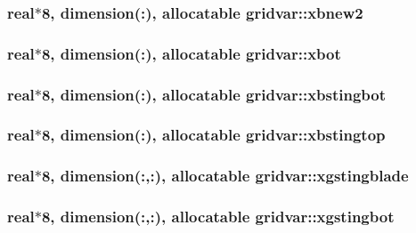 \subsubsection[{xbnew2}]{\setlength{\rightskip}{0pt plus 5cm}real$\ast$8, dimension(\+:), allocatable gridvar\+::xbnew2}\label{namespacegridvar_af05e411d94cae29c5a5ac414c9d43621}
\hypertarget{namespacegridvar_abda87534e29c12083ccea2d949c300e9}{}
\subsubsection[{xbot}]{\setlength{\rightskip}{0pt plus 5cm}real$\ast$8, dimension(\+:), allocatable gridvar\+::xbot}\label{namespacegridvar_abda87534e29c12083ccea2d949c300e9}
\hypertarget{namespacegridvar_a7b37df25204691373d89716e5f39a528}{}
\subsubsection[{xbstingbot}]{\setlength{\rightskip}{0pt plus 5cm}real$\ast$8, dimension(\+:), allocatable gridvar\+::xbstingbot}\label{namespacegridvar_a7b37df25204691373d89716e5f39a528}
\hypertarget{namespacegridvar_a679d95eb858c82d2409d67d8c7defa5b}{}
\subsubsection[{xbstingtop}]{\setlength{\rightskip}{0pt plus 5cm}real$\ast$8, dimension(\+:), allocatable gridvar\+::xbstingtop}\label{namespacegridvar_a679d95eb858c82d2409d67d8c7defa5b}
\hypertarget{namespacegridvar_adc4e81d08a89fa23d69d38d5128e0e97}{}
\subsubsection[{xgstingblade}]{\setlength{\rightskip}{0pt plus 5cm}real$\ast$8, dimension(\+:,\+:), allocatable gridvar\+::xgstingblade}\label{namespacegridvar_adc4e81d08a89fa23d69d38d5128e0e97}
\hypertarget{namespacegridvar_a280b9f2c74950beb202cb0aae123fb8a}{}
\subsubsection[{xgstingbot}]{\setlength{\rightskip}{0pt plus 5cm}real$\ast$8, dimension(\+:,\+:), allocatable gridvar\+::xgstingbot}\label{namespacegridvar_a280b9f2c74950beb202cb0aae123fb8a}
\hypertarget{namespacegridvar_a995496c4b06b80179c34232029a8c471}{}
